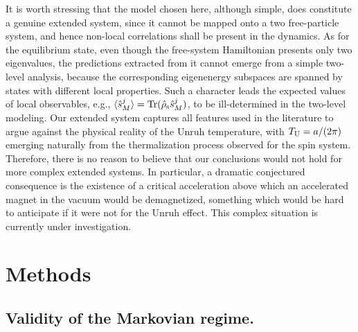 \documentclass[]{nature}
\begin{document}
{It is worth stressing that the model chosen here, although simple, does 
constitute a genuine extended system, since it cannot be mapped onto a two free-particle system, 
and hence non-local correlations shall be present in the dynamics. As for the equilibrium state, even though the free-system Hamiltonian presents only two eigenvalues, 
the predictions extracted from it cannot emerge from a simple two-level analysis, because the corresponding eigenenergy subspaces are spanned by states with different 
local properties. Such a character leads the expected values of local observables, e.g., $\langle\hat{s}^j_M\rangle={\rm Tr}(\hat{\rho}_{\rm s}\hat{s}^j_M)$, to be ill-determined in 
the two-level modeling. Our extended system captures all features used in the literature to argue against the physical reality of the Unruh temperature, with $T_{\rm U} = a/(2\pi)$ emerging
naturally from the thermalization process observed for the spin system.
Therefore, there is no reason to believe that our conclusions would not hold for more complex extended systems. In particular, a dramatic
 conjectured consequence
is the existence of a  critical acceleration 
above which an accelerated  magnet in the vacuum would be demagnetized, 
something which would be hard to anticipate if it were not for the Unruh effect. 
This complex situation is currently under investigation.
    
\section{Methods}


\subsection{Validity of the Markovian regime.}

}
\end{document}
